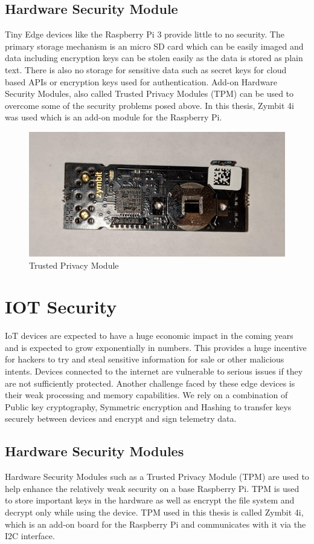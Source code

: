 \documentclass[11pt,openright]{report}
\begin{document}
\subsection{Hardware Security Module}
Tiny Edge devices like the Raspberry Pi 3 provide little to no security.
The primary storage mechanism is an micro SD card which can be easily imaged and data including encryption keys can be stolen easily as the data is stored as plain text. There is also no storage for sensitive data such as secret keys for cloud based APIs or encryption keys used for authentication. Add-on Hardware Security Modules, also called Trusted Privacy Modules (TPM) can be used to overcome some of the security problems posed above. In this thesis, Zymbit 4i was used which is an add-on module for the Raspberry Pi.

\begin{figure}
	\centering
	\includegraphics[scale=0.1]{images/tpm.jpg}
	\caption{Trusted Privacy Module}
	\label{fig:tpm}
\end{figure}


\section{IOT Security}
IoT devices are expected to have a huge economic impact in the coming years and is expected to grow exponentially in numbers. This provides a huge incentive for hackers to try and steal sensitive information for sale or other malicious intents. Devices connected to the internet are vulnerable to serious issues if they are not sufficiently protected. Another challenge faced by these edge devices is their weak processing and memory capabilities. We rely on a combination of Public key cryptography, Symmetric encryption and Hashing to transfer keys securely between devices and encrypt and sign telemetry data. 

\subsection{Hardware Security Modules}
Hardware Security Modules such as a Trusted Privacy Module (TPM) are used to help enhance the relatively weak security on a base Raspberry Pi. TPM is used to store important keys in the hardware as well as encrypt the file system and decrypt only while using the device. TPM used in this thesis is called Zymbit 4i, which is an add-on board for the Raspberry Pi and communicates with it via the I2C interface.
\end{document}

